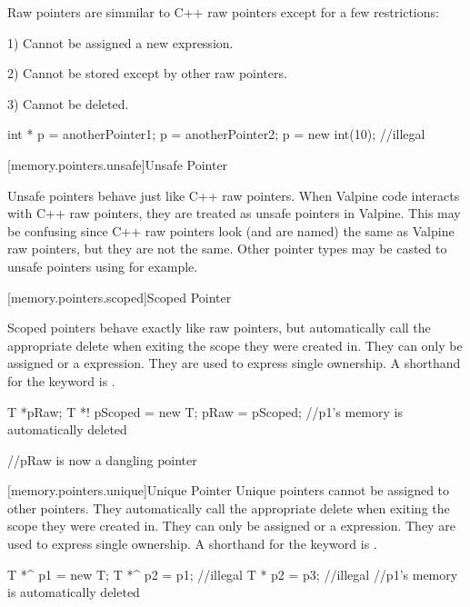 Raw pointers are simmilar to C++ raw pointers except for a few restrictions:

	1) Cannot be assigned a new expression.
	
	2) Cannot be stored except by other raw pointers.
	
	3) Cannot be deleted.
 
\enterexample
\begin{codeblock}
int * p = anotherPointer1;
p = anotherPointer2;
p = new int(10);	//illegal
\end{codeblock}
\exitexample


[memory.pointers.unsafe]{Unsafe Pointer}

Unsafe pointers behave just like C++ raw pointers. When Valpine code interacts with C++ raw pointers, they are treated as unsafe pointers in Valpine. This may be confusing since C++ raw pointers look (and are named) the same as Valpine raw pointers, but they are not the same. Other pointer types may be casted to unsafe pointers using  for example.

	
[memory.pointers.scoped]{Scoped Pointer}

Scoped pointers behave exactly like raw pointers, but automatically call the appropriate delete when exiting the scope they were created in. They can only be assigned  or a  expression. They are used to express single ownership. A shorthand for the  keyword is \tcode{!}.

\begin{codeblock}

T *pRaw;
{
	T *! pScoped = new T;
	pRaw = pScoped;
} //p1's memory is automatically deleted

//pRaw is now a dangling pointer

\end{codeblock}

[memory.pointers.unique]{Unique Pointer}
Unique pointers cannot be assigned to other pointers. They automatically call the appropriate delete when exiting the scope they were created in. They can only be assigned  or a  expression. They are used to express single ownership. A shorthand for the  keyword is \tcode{\^}.


\begin{codeblock}
{
	T *^ p1 = new T;
	T *^ p2 = p1; //illegal
	T * p2 = p3; //illegal
} //p1's memory is automatically deleted

\end{codeblock}

